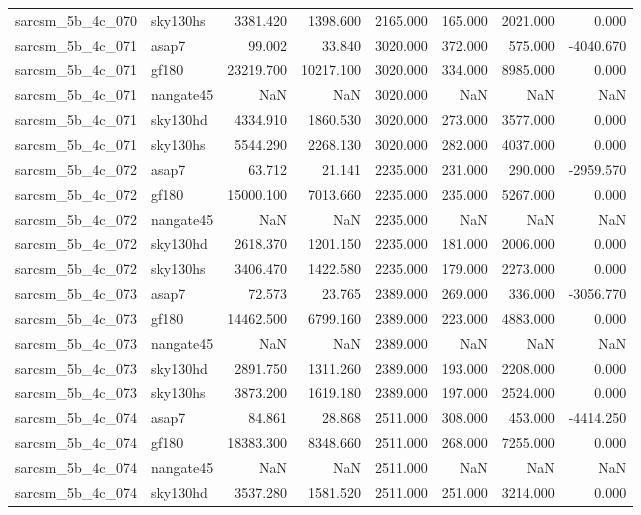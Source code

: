 \begin{tabular}{llrrrrrr}
sarcsm\_5b\_4c\_070 & sky130hs & 3381.420 & 1398.600 & 2165.000 & 165.000 & 2021.000 & 0.000 \\
sarcsm\_5b\_4c\_071 & asap7 & 99.002 & 33.840 & 3020.000 & 372.000 & 575.000 & -4040.670 \\
sarcsm\_5b\_4c\_071 & gf180 & 23219.700 & 10217.100 & 3020.000 & 334.000 & 8985.000 & 0.000 \\
sarcsm\_5b\_4c\_071 & nangate45 & NaN & NaN & 3020.000 & NaN & NaN & NaN \\
sarcsm\_5b\_4c\_071 & sky130hd & 4334.910 & 1860.530 & 3020.000 & 273.000 & 3577.000 & 0.000 \\
sarcsm\_5b\_4c\_071 & sky130hs & 5544.290 & 2268.130 & 3020.000 & 282.000 & 4037.000 & 0.000 \\
sarcsm\_5b\_4c\_072 & asap7 & 63.712 & 21.141 & 2235.000 & 231.000 & 290.000 & -2959.570 \\
sarcsm\_5b\_4c\_072 & gf180 & 15000.100 & 7013.660 & 2235.000 & 235.000 & 5267.000 & 0.000 \\
sarcsm\_5b\_4c\_072 & nangate45 & NaN & NaN & 2235.000 & NaN & NaN & NaN \\
sarcsm\_5b\_4c\_072 & sky130hd & 2618.370 & 1201.150 & 2235.000 & 181.000 & 2006.000 & 0.000 \\
sarcsm\_5b\_4c\_072 & sky130hs & 3406.470 & 1422.580 & 2235.000 & 179.000 & 2273.000 & 0.000 \\
sarcsm\_5b\_4c\_073 & asap7 & 72.573 & 23.765 & 2389.000 & 269.000 & 336.000 & -3056.770 \\
sarcsm\_5b\_4c\_073 & gf180 & 14462.500 & 6799.160 & 2389.000 & 223.000 & 4883.000 & 0.000 \\
sarcsm\_5b\_4c\_073 & nangate45 & NaN & NaN & 2389.000 & NaN & NaN & NaN \\
sarcsm\_5b\_4c\_073 & sky130hd & 2891.750 & 1311.260 & 2389.000 & 193.000 & 2208.000 & 0.000 \\
sarcsm\_5b\_4c\_073 & sky130hs & 3873.200 & 1619.180 & 2389.000 & 197.000 & 2524.000 & 0.000 \\
sarcsm\_5b\_4c\_074 & asap7 & 84.861 & 28.868 & 2511.000 & 308.000 & 453.000 & -4414.250 \\
sarcsm\_5b\_4c\_074 & gf180 & 18383.300 & 8348.660 & 2511.000 & 268.000 & 7255.000 & 0.000 \\
sarcsm\_5b\_4c\_074 & nangate45 & NaN & NaN & 2511.000 & NaN & NaN & NaN \\
sarcsm\_5b\_4c\_074 & sky130hd & 3537.280 & 1581.520 & 2511.000 & 251.000 & 3214.000 & 0.000 \\

\end{tabular}
